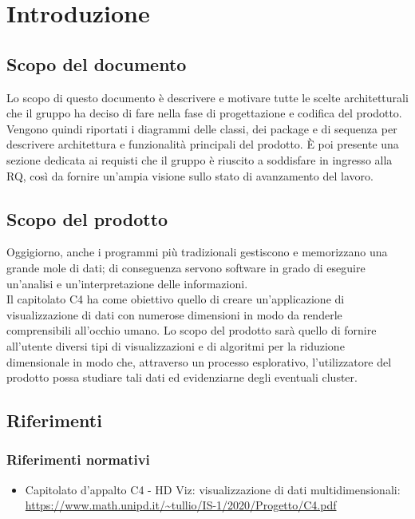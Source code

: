 \section{Introduzione}
\subsection{Scopo del documento}
Lo scopo di questo documento è descrivere e motivare tutte le scelte architetturali che il gruppo \Gruppo{} ha deciso di fare nella fase di progettazione e codifica del prodotto. Vengono quindi riportati i diagrammi delle classi, dei package e di sequenza per descrivere architettura e funzionalità principali del prodotto.
È poi presente una sezione dedicata ai requisti che il gruppo è riuscito a soddisfare in ingresso alla RQ, così da fornire un'ampia visione sullo stato di avanzamento del lavoro.

\subsection{Scopo del prodotto}
Oggigiorno, anche i programmi più tradizionali gestiscono e memorizzano una grande mole di dati; di conseguenza servono software in grado di eseguire un'analisi e un'interpretazione delle informazioni.\\
Il capitolato C4 ha come obiettivo quello di creare un'applicazione di visualizzazione di dati con numerose dimensioni in modo da renderle comprensibili all'occhio umano.  Lo scopo del prodotto sarà quello di fornire all'utente diversi tipi di visualizzazioni e di algoritmi per la riduzione dimensionale in modo che, attraverso un processo esplorativo, l'utilizzatore del prodotto possa studiare tali dati ed evidenziarne degli eventuali cluster.

\subsection{Riferimenti}
\subsubsection{Riferimenti normativi}
\begin{itemize}
	\item	Capitolato d'appalto C4 - HD Viz: visualizzazione di dati multidimensionali: \\
	\textcolor{blue}{\url{https://www.math.unipd.it/~tullio/IS-1/2020/Progetto/C4.pdf}}
\end{itemize}


